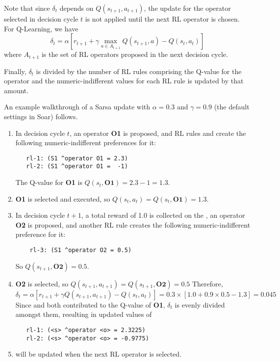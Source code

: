 Note that since $\delta_t$ depends on $Q(s_{t+1}, a_{t+1})$, the update for the operator selected in decision cycle $t$ is not applied until the next RL operator is chosen.
For Q-Learning, we have
$$ \delta_t = \alpha \left[ r_{t+1} + \gamma \underset{a \in A_{t+1}}{\max} Q(s_{t+1}, a) - Q(s_t, a_t) \right] $$
where $A_{t+1}$ is the set of RL operators proposed in the next decision cycle.

Finally, $\delta_t$ is divided by the number of RL rules comprising the Q-value for the operator and the numeric-indifferent values for each RL rule is updated by that amount.

An example walkthrough of a Sarsa update with $\alpha = 0.3$ and $\gamma = 0.9$ (the default settings in Soar) follows.

\begin{enumerate}

\item In decision cycle $t$, an operator \textbf{O1} is proposed, and RL rules  and  create the following numeric-indifferent preferences for it:
\begin{verbatim}
   rl-1: (S1 ^operator O1 = 2.3)
   rl-2: (S1 ^operator O1 =  -1)
\end{verbatim}  
	The Q-value for \textbf{O1} is $Q(s_t, \textbf{O1}) = 2.3 - 1 = 1.3$.
	 
\item \textbf{O1} is selected and executed, so $Q(s_t, a_t) = Q(s_t, \textbf{O1}) = 1.3$.

\item In decision cycle $t+1$, a total reward of 1.0 is collected on the , an operator \textbf{O2} is proposed, and another RL rule  creates the following numeric-indifferent preference for it:
\begin{verbatim}
	rl-3: (S1 ^operator O2 = 0.5)
\end{verbatim}
	So $Q(s_{t+1}, \textbf{O2}) = 0.5$.

\item \textbf{O2} is selected, so $Q(s_{t+1}, a_{t+1}) = Q(s_{t+1}, \textbf{O2}) = 0.5$
	Therefore, 
	$$\delta_t = \alpha \left[r_{t+1} + \gamma Q(s_{t+1}, a_{t+1}) - Q(s_t, a_t) \right] = 0.3 \times [ 1.0 + 0.9 \times 0.5 - 1.3 ] = 0.045$$
	Since  and  both contributed to the Q-value of \textbf{O1}, $\delta_t$ is evenly divided amongst them, resulting in updated values of
\begin{verbatim}
   rl-1: (<s> ^operator <o> = 2.3225)
   rl-2: (<s> ^operator <o> = -0.9775)
\end{verbatim}

\item {} will be updated when the next RL operator is selected.
\end{enumerate}

